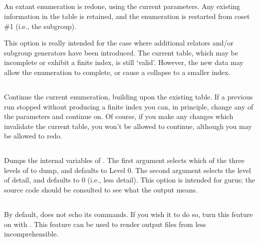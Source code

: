 \subsection{}
\label{cmd:check}
\label{cmd:redo}

An extant enumeration is redone, using the current parameters.
Any existing information in the table is retained, and the enumeration
  is restarted from coset \#1 (i.e., the subgroup).

This option is really intended for the case where additional relators
  and/or subgroup generators have been introduced.
The current table, which may be incomplete or exhibit a finite index, is
  still `valid'\kern-1.5pt.
However, the new data may allow the enumeration to complete, or cause a
  collapse to a smaller index.

\subsection{}
\label{cmd:continue}

Continue the current enumeration, building upon the existing table.
If a previous run stopped without producing a finite index you can, in
  principle, change any of the parameters and continue on.
Of course, if you make any changes which invalidate the current table, you
  won't be allowed to continue, although you may be allowed to redo.

\subsection{}
\label{cmd:dump}

Dumps the internal variables of \ace.
The first argument selects which of the three levels of {\ace} to dump, and
  defaults to Level $0$.
The second argument selects the level of detail, and defaults to $0$
  (i.e., less detail).
This option is intended for gurus; the source code should be consulted to
  see what the output means.

\subsection{}
\label{cmd:echo}

By default, {\ace} does not echo its commands.
If you wish it to do so, turn this feature on with .
This feature can be used to render output files from {\ace} less
  incomprehensible.

